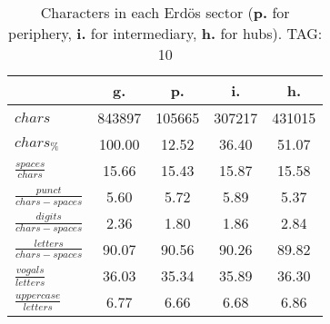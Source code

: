 \begin{table}[h!]
\begin{center}
\begin{tabular}{| l | c | c | c | c |}\hline
 & g. & p. & i. & h. \\\hline
$chars$ & 843897  & 105665  & 307217  & 431015 \\\hline
$chars_{\%}$ & 100.00  & 12.52  & 36.40  & 51.07 \\\hline
$\frac{spaces}{chars}$ & 15.66  & 15.43  & 15.87  & 15.58 \\\hline
$\frac{punct}{chars-spaces}$ & 5.60  & 5.72  & 5.89  & 5.37 \\\hline
$\frac{digits}{chars-spaces}$ & 2.36  & 1.80  & 1.86  & 2.84 \\\hline
$\frac{letters}{chars-spaces}$ & 90.07  & 90.56  & 90.26  & 89.82 \\\hline
$\frac{vogals}{letters}$ & 36.03  & 35.34  & 35.89  & 36.30 \\\hline
$\frac{uppercase}{letters}$ & 6.77  & 6.66  & 6.68  & 6.86 \\\hline
\end{tabular}
\caption{Characters in each Erd\"os sector ({{\bf p.}} for periphery, {{\bf i.}} for intermediary, 
    {{\bf h.}} for hubs). TAG: 10}
\end{center}
\end{table}